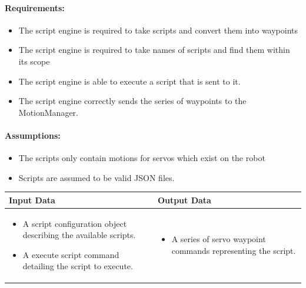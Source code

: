 \documentclass[english,12pt]{scrartcl}
\begin{document}
		\paragraph{Requirements:}
		\begin{itemize}
			\item The script engine is required to take scripts and convert them into waypoints
			\item The script engine is required to take names of scripts and find them within its scope
			\item The script engine is able to execute a script that is sent to it.
			\item The script engine correctly sends the series of waypoints to the MotionManager.
		\end{itemize}
		
		\paragraph{Assumptions:}
		\begin{itemize}
			\item The scripts only contain motions for servos which exist on the robot
			\item Scripts are assumed to be valid JSON files.
		\end{itemize}
		
		\begin{tabular}{p{7cm}|p{7cm}}
			\textbf{Input Data} & \textbf{Output Data} \\ \hline
			\begin{itemize}
				\item A script configuration object describing the available scripts.
				\item A execute script command detailing the script to execute.
			\end{itemize}
			&
			\begin{itemize}
				\item A series of servo waypoint commands representing the script.
			\end{itemize}
		\end{tabular}
\end{document}

